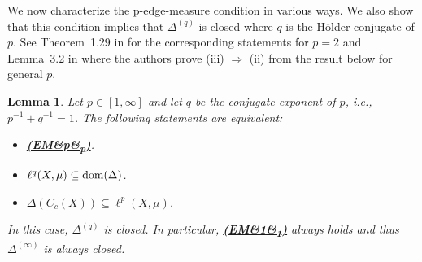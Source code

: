 \documentclass[letterpaper]{article}
\newtheorem{lemma}{Lemma}[section]
\theoremstyle{definition}
\theoremstyle{named}
\numberwithin{equation}{section}
\newcommand{\EM}[1][]{\hyperlink{ass:EM}{\textup{\textbf{(EM\ifx&#1&\else\textsubscript{#1}\fi)}}}}
\newcommand{\dom}{\textnormal{dom}} %
\begin{document}
We now characterize the p-edge-measure condition in various ways. We also show that
this condition implies that $\Delta^{(q)}$ is closed where $q$ is the H{\"o}lder conjugate
of $p$.
See Theorem~1.29 in \cite{keller2021graphs} for the corresponding statements for $p=2$
and Lemma~3.2 in \cite{milatovic2015maximal} where the authors prove (iii) $\Longrightarrow$ (ii)
from the result below
for general $p$.
\begin{lemma}\label{lem:EMp}
Let $p\in[1,\infty]$ and let $q$ be the  conjugate exponent of $p$, i.e.,  $p^{-1}+q^{-1}=1$.
The following statements are equivalent:
\begin{itemize}
\item[\textup{(i)}]   \EM[p].
\item[\textup{(ii)}]  $\ell^{q}(X,\mu)\subseteq\dom(\Delta)$.
\item[\textup{(iii)}] $\Delta(C_c(X))\subseteq\ell^{p}(X,\mu)$.
\end{itemize}
In this case, $\Delta^{(q)}$ is closed.
In particular, \EM[1] always holds and thus $\Delta^{(\infty)}$ is always closed.
\end{lemma}
\end{document}
